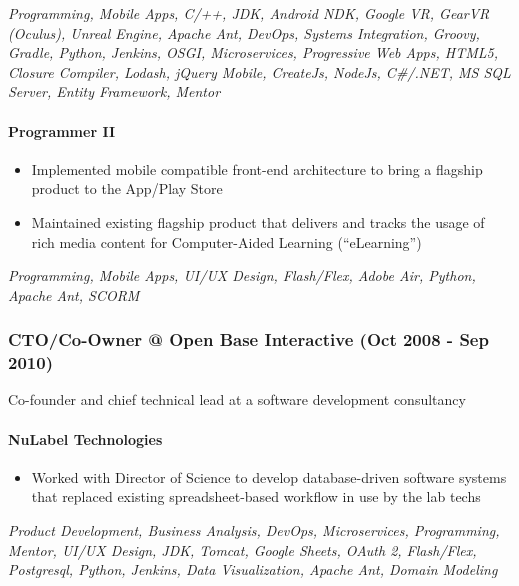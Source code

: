 \emph{Programming, Mobile Apps, C/++, JDK, Android NDK, Google VR,
GearVR (Oculus), Unreal Engine, Apache Ant, DevOps, Systems Integration,
Groovy, Gradle, Python, Jenkins, OSGI, Microservices, Progressive Web
Apps, HTML5, Closure Compiler, Lodash, jQuery Mobile, CreateJs, NodeJs,
C\#/.NET, MS SQL Server, Entity Framework, Mentor}

\hypertarget{programmer-ii}{%
\paragraph{Programmer II}\label{programmer-ii}}

\begin{itemize}
\tightlist
\item
  Implemented mobile compatible front-end architecture to bring a
  flagship product to the App/Play Store
\item
  Maintained existing flagship product that delivers and tracks the
  usage of rich media content for Computer-Aided Learning
  (``eLearning'')
\end{itemize}

\emph{Programming, Mobile Apps, UI/UX Design, Flash/Flex, Adobe Air,
Python, Apache Ant, SCORM}

\hypertarget{ctoco-owner-open-base-interactive-oct-2008---sep-2010}{%
\subsubsection{CTO/Co-Owner @ Open Base Interactive (Oct 2008 - Sep
2010)}\label{ctoco-owner-open-base-interactive-oct-2008---sep-2010}}

Co-founder and chief technical lead at a software development
consultancy

\hypertarget{nulabel-technologies}{%
\paragraph{NuLabel Technologies}\label{nulabel-technologies}}

\begin{itemize}
\tightlist
\item
  Worked with Director of Science to develop database-driven software
  systems that replaced existing spreadsheet-based workflow in use by
  the lab techs
\end{itemize}

\emph{Product Development, Business Analysis, DevOps, Microservices,
Programming, Mentor, UI/UX Design, JDK, Tomcat, Google Sheets, OAuth 2,
Flash/Flex, Postgresql, Python, Jenkins, Data Visualization, Apache Ant,
Domain Modeling}

